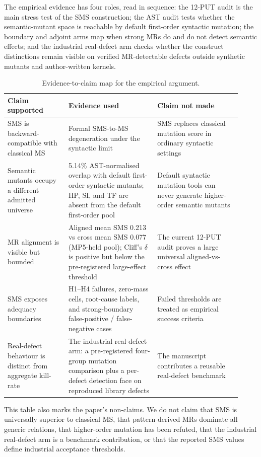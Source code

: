 \documentclass[manuscript,screen,review]{acmart}
\begin{document}
The empirical evidence has four roles, read in sequence: the 12-PUT audit is the
main stress test of the SMS construction; the AST audit tests whether the
semantic-mutant space is reachable by default first-order syntactic mutation;
the boundary and adjoint arms map when strong MRs do and do not detect semantic
effects; and the industrial real-defect arm checks whether the construct
distinctions remain visible on verified MR-detectable defects outside synthetic
mutants and author-written kernels.

\begin{table}[t]
\caption{Evidence-to-claim map for the empirical argument.}
\label{tab:claim-evidence-map}
\centering
\small
\begin{tabular}{p{0.24\linewidth}p{0.35\linewidth}p{0.33\linewidth}}
\toprule
Claim supported & Evidence used & Claim not made \\
\midrule
SMS is backward-compatible with classical MS & Formal SMS-to-MS
degeneration under the syntactic limit & SMS replaces classical mutation
score in ordinary syntactic settings \\
Semantic mutants occupy a different admitted universe & 5.14\%
AST-normalised overlap with default first-order syntactic mutants;
HP, SI, and TF are absent from the default first-order pool & Default
syntactic mutation tools can never generate higher-order semantic
mutants \\
MR alignment is visible but bounded & Aligned mean SMS 0.213 vs
cross mean SMS 0.077 (MP5-held pool); Cliff's \(\delta\) is positive but below the
pre-registered large-effect threshold & The current 12-PUT audit proves
a large universal aligned-vs-cross effect \\
SMS exposes adequacy boundaries & H1--H4 failures, zero-mass cells,
root-cause labels, and strong-boundary false-positive / false-negative
cases & Failed thresholds are treated as empirical success criteria \\
Real-defect behaviour is distinct from aggregate kill-rate & The
industrial real-defect arm: a pre-registered four-group mutation
comparison plus a per-defect detection face on reproduced library
defects & The manuscript contributes a reusable
real-defect benchmark \\
\bottomrule
\end{tabular}
\normalsize
\end{table}

This table also marks the paper's non-claims. We do not claim that SMS
is universally superior to classical MS, that pattern-derived MRs
dominate all generic relations, that higher-order mutation has been
refuted, that the industrial real-defect arm is a benchmark contribution, or that
the reported SMS values define industrial acceptance thresholds.
\end{document}
